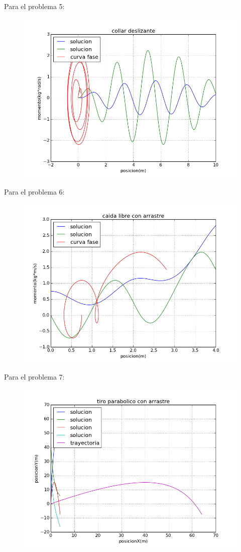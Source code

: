 \documentclass[letterpaper]{article}
\begin{document}
Para el problema 5:
\begin{figure}[H]
	\centering
	\includegraphics[scale=0.5]{Problema5_Ricardo.png} 
\end{figure}
Para el problema 6:
\begin{figure}[H]
	\centering
	\includegraphics[scale=0.5]{Problema6_Ricardo.png} 
\end{figure}
Para el problema 7:
\begin{figure}[H]
	\centering
	\includegraphics[scale=0.5]{Problema7_Ricardo.png} 
\end{figure}
\end{document}
